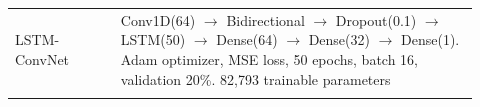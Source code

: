 \begin{longtable}{>{\raggedright\arraybackslash}p{0.21\linewidth}>{\raggedright\arraybackslash}p{0.71\linewidth}}
\hspace{.6em}LSTM-ConvNet & Conv1D(64) $\to$ Bidirectional $\to$ Dropout(0.1) $\to$ LSTM(50) $\to$ Dense(64) $\to$ Dense(32) $\to$ Dense(1). Adam optimizer, MSE loss, 50 epochs, batch 16, validation 20\%. 82,793 trainable parameters \\
\addlinespace
\end{longtable}

